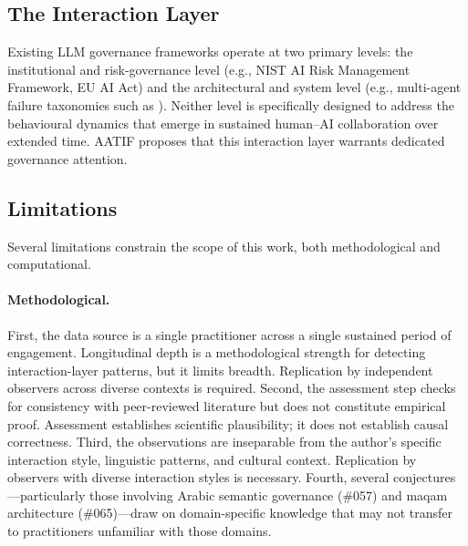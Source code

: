 \documentclass[11pt,a4paper]{article}
\begin{document}
\subsection{The Interaction Layer}

Existing LLM governance frameworks operate at two primary levels: the institutional and risk-governance level (e.g., NIST AI Risk Management Framework, EU AI Act) and the architectural and system level (e.g., multi-agent failure taxonomies such as \citet{cemri2025}). Neither level is specifically designed to address the behavioural dynamics that emerge in sustained human--AI collaboration over extended time. AATIF proposes that this interaction layer warrants dedicated governance attention.

\subsection{Limitations}

Several limitations constrain the scope of this work, both methodological and computational.

\paragraph{Methodological.} First, the data source is a single practitioner across a single sustained period of engagement. Longitudinal depth is a methodological strength for detecting interaction-layer patterns, but it limits breadth. Replication by independent observers across diverse contexts is required. Second, the assessment step checks for consistency with peer-reviewed literature but does not constitute empirical proof. Assessment establishes scientific plausibility; it does not establish causal correctness. Third, the observations are inseparable from the author's specific interaction style, linguistic patterns, and cultural context. Replication by observers with diverse interaction styles is necessary. Fourth, several conjectures---particularly those involving Arabic semantic governance (\#057) and maqam architecture (\#065)---draw on domain-specific knowledge that may not transfer to practitioners unfamiliar with those domains.
\end{document}
